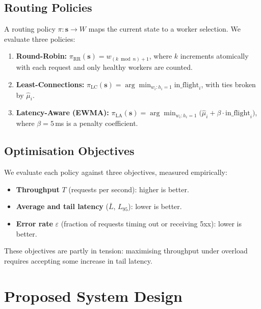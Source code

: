 \documentclass[conference]{IEEEtran}
\begin{document}
\subsection{Routing Policies}

A routing policy $\pi : \mathbf{s} \rightarrow W$ maps the current
state to a worker selection. We evaluate three policies:

\begin{enumerate}
    \item \textbf{Round-Robin:} $\pi_{\text{RR}}(\mathbf{s}) = w_{(k \bmod n)+1}$,
    where $k$ increments atomically with each request and only healthy
    workers are counted.
    \item \textbf{Least-Connections:}
    $\pi_{\text{LC}}(\mathbf{s}) = \arg\min_{w_i : h_i=1}
    \text{in\_flight}_i$, with ties broken by $\hat{\mu}_i$.
    \item \textbf{Latency-Aware (EWMA):}
    $\pi_{\text{LA}}(\mathbf{s}) = \arg\min_{w_i : h_i=1}
    \bigl(\hat{\mu}_i + \beta \cdot \text{in\_flight}_i\bigr)$,
    where $\beta = 5$\,ms is a penalty coefficient.
\end{enumerate}

\subsection{Optimisation Objectives}

We evaluate each policy against three objectives, measured empirically:
\begin{itemize}
    \item \textbf{Throughput} $T$ (requests per second): higher is better.
    \item \textbf{Average and tail latency} ($\bar{L}$, $L_{95}$): lower is better.
    \item \textbf{Error rate} $\varepsilon$ (fraction of requests timing out
    or receiving 5xx): lower is better.
\end{itemize}

These objectives are partly in tension: maximising throughput under
overload requires accepting some increase in tail latency.

\section{Proposed System Design}
\end{document}
